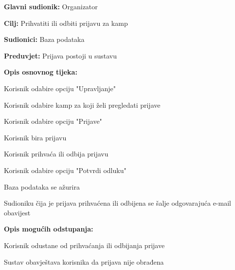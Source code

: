 					\noindent {}
					\begin{packed_item}
						
						\item \textbf{Glavni sudionik: } Organizator
						\item  \textbf{Cilj:} Prihvatiti ili odbiti prijavu za kamp
						\item  \textbf{Sudionici:} Baza podataka
						\item  \textbf{Preduvjet:} Prijava postoji u sustavu
						\item  \textbf{Opis osnovnog tijeka:}
						
						\item[] \begin{packed_enum}
							
							\item Korisnik odabire opciju "Upravljanje"
							\item Korisnik odabire kamp za koji želi pregledati prijave
							\item Korisnik odabire opciju "Prijave"
							\item Korisnik bira prijavu
							\item Korisnik prihvaća ili odbija prijavu
							\item Korisnik odabire opciju "Potvrdi odluku"
							\item Baza podataka se ažurira
							\item Sudioniku čija je prijava prihvaćena ili odbijena se šalje odgovarajuća e-mail obavijest
						\end{packed_enum}
						
						\item  \textbf{Opis mogućih odstupanja:}
						
						\item[] \begin{packed_item}
							
							\item[5.a] Korisnik odustane od prihvaćanja ili odbijanja prijave
							\item[] \begin{packed_enum}
								
								\item Sustav obavještava korisnika da prijava nije obrađena
								
							\end{packed_enum}												
						\end{packed_item}
					\end{packed_item}
				
